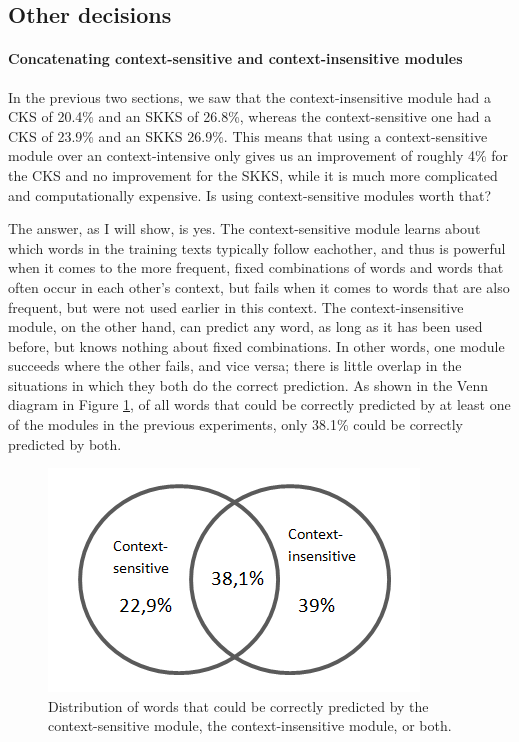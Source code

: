 \documentclass[11pt]{article}
\begin{document}
\subsection{Other decisions}

\paragraph{Concatenating context-sensitive and context-insensitive modules} \label{concat}
In the previous two sections, we saw that the context-insensitive module had a CKS of 20.4\% and an SKKS of 26.8\%, whereas the context-sensitive one had a CKS of 23.9\% and an SKKS 26.9\%. This means that using a context-sensitive module over an context-intensive only gives us an improvement of roughly 4\% for the CKS and no improvement for the SKKS, while it is much more complicated and computationally expensive. Is using context-sensitive modules worth that?

The answer, as I will show, is yes. The context-sensitive module learns about which words in the training texts typically follow eachother, and thus is powerful when it comes to the more frequent, fixed combinations of words and words that often occur in each other's context, but fails when it comes to words that are also frequent, but were not used earlier in this context. The context-insensitive module, on the other hand, can predict any word, as long as it has been used before, but knows nothing about fixed combinations. In other words, one module succeeds where the other fails, and vice versa; there is little overlap in the situations in which they both do the correct prediction. As shown in the Venn diagram in Figure \ref{venn}, of all words that could be correctly predicted by at least one of the modules in the previous experiments, only 38.1\% could be correctly predicted by both.

\begin{figure}[H] \centering
\includegraphics[scale=1]{venn}
\caption{Distribution of words that could be correctly predicted by the context-sensitive module, the context-insensitive module, or both.}
\label{venn}
\end{figure} 
\end{document}
